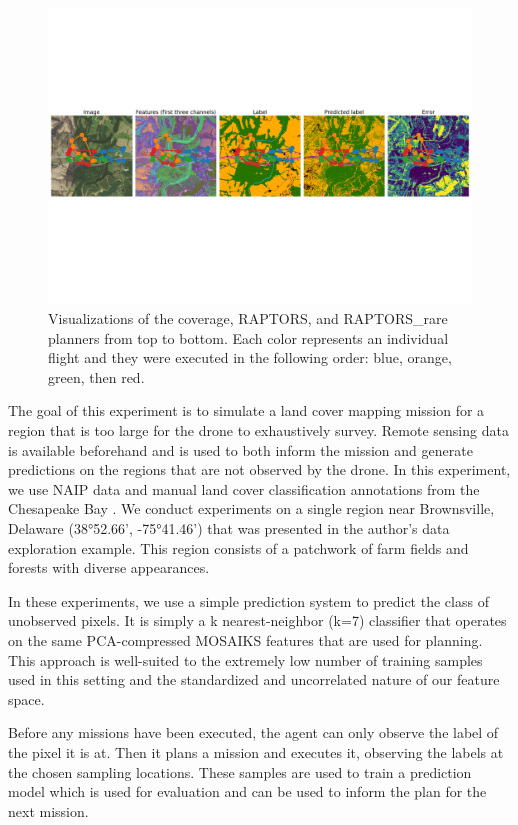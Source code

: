 \begin{figure}
    \includegraphics[width=\textwidth, trim={0 16cm 0 16cm}, clip]{figs/results/ipp/4000/paired_qual/raptors_rare.png}
    \caption{Visualizations of the coverage, RAPTORS, and RAPTORS\_rare planners from top to bottom. Each color represents an individual flight and they were executed in the following order: blue, orange, green, then red.}
    \label{fig:results:ipp_pairqual}
\end{figure}
The goal of this experiment is to simulate a land cover mapping mission for a region that is too large for the drone to exhaustively survey. Remote sensing data is available beforehand and is used to both inform the mission and generate predictions on the regions that are not observed by the drone. In this experiment, we use NAIP data \cite{U.S.DepartmentofAgriculture2011NationalSheet} and manual land cover classification annotations from the Chesapeake Bay \cite{Claggett2014ChesapeakeProduction}. We conduct experiments on a single region near Brownsville, Delaware (38°52.66', -75°41.46') that was presented in the author's data exploration example. This region consists of a patchwork of farm fields and forests with diverse appearances. 

In these experiments, we use a simple prediction system to predict the class of unobserved pixels. It is simply a k nearest-neighbor (k=7) classifier that operates on the same PCA-compressed MOSAIKS features that are used for planning. This approach is well-suited to the extremely low number of training samples used in this setting and the standardized and uncorrelated nature of our feature space.

Before any missions have been executed, the agent can only observe the label of the pixel it is at. Then it plans a mission and executes it, observing the labels at the chosen sampling locations. These samples are used to train a prediction model which is used for evaluation and can be used to inform the plan for the next mission. 

